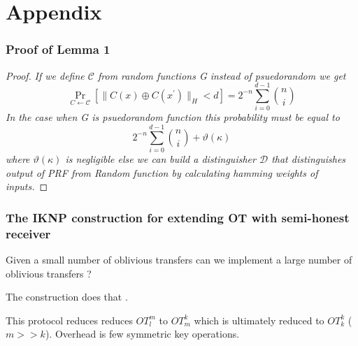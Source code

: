 \documentclass[hyperref={pdfpagelabels=false}]{beamer}
\theoremstyle{remark}
\begin{document}
\section{Appendix}
\begin{frame}
\frametitle{Proof of Lemma 1}
\begin{proof}
\textit{If we define $\mathcal{C}$ from random functions G instead of psuedorandom we get
\begin{equation*}
\Pr_{C\leftarrow \mathcal{C}} \left[ \|C(x) \oplus C(x^\prime)\|_H < d \right] = 2^{-n}\sum_{i=0}^{d-1} {n \choose i}
\end{equation*}
In the case when G is psuedorandom function this probability must be equal to
\begin{equation*}
2^{-n}\sum_{i=0}^{d-1} {n \choose i} + \vartheta(\kappa)
\end{equation*}
where $\vartheta(\kappa)$ is negligible
else we can build a distinguisher $\mathcal{D}$ that distinguishes output of PRF from Random function by calculating hamming weights of inputs.}
\end{proof}

\end{frame}

\begin{frame}
\frametitle{The IKNP construction for extending OT with semi-honest receiver}
Given a small number of oblivious transfers can we implement a large number of oblivious transfers ? \par \pause
The \cite{IKNP} construction does that \smiley{}.\par \pause
This protocol reduces reduces $OT_l^m$ to $OT_m^k$ which is ultimately reduced to $OT_k^k$ ($m >> k$). Overhead is few symmetric key operations.
\end{frame}
\end{document}
